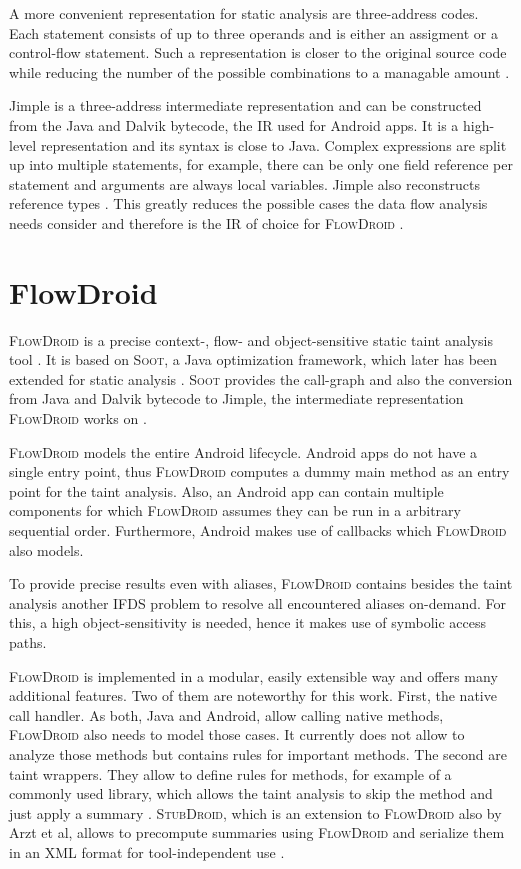 \documentclass[../draft.tex]{subfiles}
\begin{document}
    A more convenient representation for static analysis are three-address codes. Each statement consists of up to three operands and is either an assigment or a control-flow statement. Such a representation is closer to the original source code while reducing the number of the possible combinations to a managable amount \cite{Aho1986}.

    Jimple is a three-address intermediate representation and can be constructed from the Java and Dalvik bytecode, the IR used for Android apps. It is a high-level representation and its syntax is close to Java. Complex expressions are split up into multiple statements, for example, there can be only one field reference per statement and arguments are always local variables. Jimple also reconstructs reference types \cite{Valleerai2004}. This greatly reduces the possible cases the data flow analysis needs consider and therefore is the IR of choice for \textsc{FlowDroid} \cite{Arzt2017PhD}.

    \section{FlowDroid}    
    \textsc{FlowDroid} is a precise context-, flow- and object-sensitive static taint analysis tool \cite{Arzt2014}. It is based on \textsc{Soot}, a Java optimization framework, which later has been extended for static analysis \cite{Lam2011}. \textsc{Soot} provides the call-graph and also the conversion from Java and Dalvik bytecode to Jimple, the intermediate representation \textsc{FlowDroid} works on \cite{Arzt2014}.

    \textsc{FlowDroid} models the entire Android lifecycle. Android apps do not have a single entry point, thus \textsc{FlowDroid} computes a dummy main method as an entry point for the taint analysis. Also, an Android app can contain multiple components for which \textsc{FlowDroid} assumes they can be run in a arbitrary sequential order. Furthermore, Android makes use of callbacks which \textsc{FlowDroid} also models.

    To provide precise results even with aliases, \textsc{FlowDroid} contains besides the taint analysis another IFDS problem to resolve all encountered aliases on-demand. For this, a high object-sensitivity is needed, hence it makes use of symbolic access paths.

    \textsc{FlowDroid} is implemented in a modular, easily extensible way and offers many additional features. Two of them are noteworthy for this work. First, the native call handler. As both, Java and Android, allow calling native methods, \textsc{FlowDroid} also needs to model those cases. It currently does not allow to analyze those methods but contains rules for important methods. The second are taint wrappers. They allow to define rules for methods, for example of a commonly used library, which allows the taint analysis to skip the method and just apply a summary \cite{Arzt2014}. \textsc{StubDroid}, which is an extension to \textsc{FlowDroid} also by Arzt et al, allows to precompute summaries using \textsc{FlowDroid} and serialize them in an XML format for tool-independent use \cite{Arzt2017PhD}.
\end{document}
